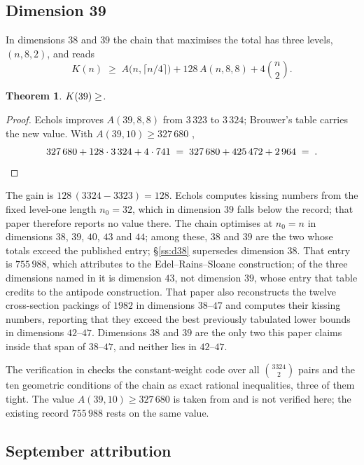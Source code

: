 \documentclass[11pt]{amsart}
\newtheorem{theorem}{Theorem}[section]
\theoremstyle{remark}
\begin{document}
\subsection{Dimension 39}\label{ss:d39}

In dimensions $38$ and $39$ the chain that maximises the total has three
levels, $(n,8,2)$, and reads
\[
  K(n)\;\ge\;A\bigl(n,\lceil n/4\rceil\bigr)+128\,A(n,8,8)+4\binom{n}{2}.
\]

\begin{theorem}\label{thm:39}
$K(39)\ge\Kh{39}$.
\end{theorem}

\begin{proof}
Echols \cite{echols2026} improves $A(39,8,8)$ from $3\,323$ to $3\,324$;
Brouwer's table \cite{brouwer} carries the new value. With
$A(39,10)\ge327\,680$ \cite{zinoviev-litsyn1984},
\[
  327\,680+128\cdot3\,324+4\cdot741 \;=\; 327\,680+425\,472+2\,964 \;=\; \Kh{39} . \qedhere
\]
\end{proof}

The gain is $128\,(3324-3323)=128$. Echols \cite{echols2026} computes kissing
numbers from the fixed level-one length $n_0=32$, which in dimension $39$ falls
below the record; that paper therefore reports no value there. The chain
optimises at $n_0=n$ in dimensions $38$, $39$, $40$, $43$ and $44$; among these, $38$ and $39$
are the two whose totals exceed the published entry; \S\ref{ss:d38} supersedes
dimension $38$. That entry is $755\,988$, which
\cite{cohn-table} attributes to the Edel--Rains--Sloane construction; of the three
dimensions named in \cite{sun-wang2026} it is dimension $43$, not dimension $39$, whose
entry that table credits to the antipode construction. That paper also reconstructs the
twelve cross-section packings of $1982$ in dimensions $38$--$47$ and computes their
kissing numbers, reporting that they exceed the best previously tabulated lower bounds
in dimensions $42$--$47$. Dimensions $38$ and $39$ are the only two this paper claims
inside that span of $38$--$47$, and neither lies in $42$--$47$.

The verification in \cite{repo} checks the constant-weight code over all
$\binom{3324}{2}$ pairs and the ten geometric conditions of the chain as exact
rational inequalities, three of them tight. The value $A(39,10)\ge327\,680$ is
taken from \cite{zinoviev-litsyn1984} and is not verified here; the existing
record $755\,988$ rests on the same value.


\subsection{September attribution}
\end{document}
